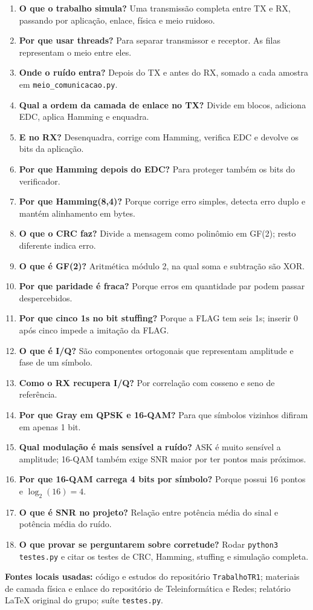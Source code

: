 \documentclass[10pt,a4paper]{article}
\newcommand{\arquivo}[1]{\texttt{#1}}
\newcommand{\codigo}[1]{\texttt{#1}}
\newcommand{\pergunta}[1]{\textbf{#1}}
\begin{document}
\begin{enumerate}
\item \pergunta{O que o trabalho simula?} Uma transmissão completa entre TX e RX, passando por aplicação, enlace, física e meio ruidoso.
\item \pergunta{Por que usar threads?} Para separar transmissor e receptor. As filas representam o meio entre eles.
\item \pergunta{Onde o ruído entra?} Depois do TX e antes do RX, somado a cada amostra em \arquivo{meio\_comunicacao.py}.
\item \pergunta{Qual a ordem da camada de enlace no TX?} Divide em blocos, adiciona EDC, aplica Hamming e enquadra.
\item \pergunta{E no RX?} Desenquadra, corrige com Hamming, verifica EDC e devolve os bits da aplicação.
\item \pergunta{Por que Hamming depois do EDC?} Para proteger também os bits do verificador.
\item \pergunta{Por que Hamming(8,4)?} Porque corrige erro simples, detecta erro duplo e mantém alinhamento em bytes.
\item \pergunta{O que o CRC faz?} Divide a mensagem como polinômio em GF(2); resto diferente indica erro.
\item \pergunta{O que é GF(2)?} Aritmética módulo 2, na qual soma e subtração são XOR.
\item \pergunta{Por que paridade é fraca?} Porque erros em quantidade par podem passar despercebidos.
\item \pergunta{Por que cinco 1s no bit stuffing?} Porque a FLAG tem seis 1s; inserir 0 após cinco impede a imitação da FLAG.
\item \pergunta{O que é I/Q?} São componentes ortogonais que representam amplitude e fase de um símbolo.
\item \pergunta{Como o RX recupera I/Q?} Por correlação com cosseno e seno de referência.
\item \pergunta{Por que Gray em QPSK e 16-QAM?} Para que símbolos vizinhos difiram em apenas 1 bit.
\item \pergunta{Qual modulação é mais sensível a ruído?} ASK é muito sensível a amplitude; 16-QAM também exige SNR maior por ter pontos mais próximos.
\item \pergunta{Por que 16-QAM carrega 4 bits por símbolo?} Porque possui 16 pontos e \(\log_2(16)=4\).
\item \pergunta{O que é SNR no projeto?} Relação entre potência média do sinal e potência média do ruído.
\item \pergunta{O que provar se perguntarem sobre corretude?} Rodar \codigo{python3 testes.py} e citar os testes de CRC, Hamming, stuffing e simulação completa.
\end{enumerate}

{\footnotesize \textbf{Fontes locais usadas:} código e estudos do repositório \arquivo{TrabalhoTR1}; materiais de camada física e enlace do repositório de Teleinformática e Redes; relatório LaTeX original do grupo; suíte \arquivo{testes.py}.}
\end{document}
